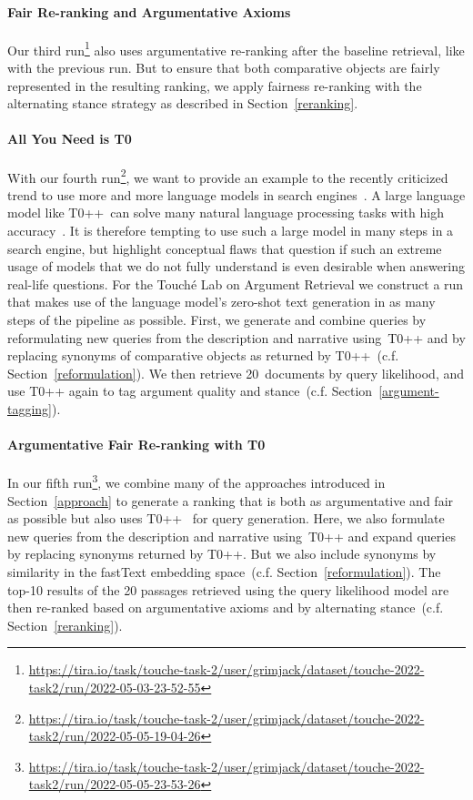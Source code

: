 \paragraph{Fair Re-ranking and Argumentative Axioms}

Our third run\footnote{\url{https://tira.io/task/touche-task-2/user/grimjack/dataset/touche-2022-task2/run/2022-05-03-23-52-55}} also uses argumentative re-ranking after the baseline retrieval, like with the previous run. But to ensure that both comparative objects are fairly represented in the resulting ranking, we apply fairness re-ranking with the alternating stance strategy as described in Section~\ref{reranking}.

\paragraph{All You Need is T0}

With our fourth run\footnote{\url{https://tira.io/task/touche-task-2/user/grimjack/dataset/touche-2022-task2/run/2022-05-05-19-04-26}}, we want to provide an example to the recently criticized trend to use more and more language models in search engines~\cite{ShahB2022}.
A large language model like T0++~can solve many natural language processing tasks with high accuracy~\cite{SanhWRBSACSLRDBXTSSKCNDCJWMSYPBWNRSSFFTBGBWR2021}.
It is therefore tempting to use such a large model in many steps in a search engine, but \citet{ShahB2022} highlight conceptual flaws that question if such an extreme usage of models that we do not fully understand is even desirable when answering real-life questions.
For the Touché Lab on Argument Retrieval we construct a run that makes use of the language model's zero-shot text generation in as many steps of the pipeline as possible.
First, we generate and combine queries by reformulating new queries from the description and narrative using~T0++ and by replacing synonyms of comparative objects as returned by T0++~(c.f. Section~\ref{reformulation}).
We then retrieve 20~documents by query likelihood, and use T0++ again to tag argument quality and stance~(c.f. Section~\ref{argument-tagging}).

\paragraph{Argumentative Fair Re-ranking with T0}

In our fifth run\footnote{\url{https://tira.io/task/touche-task-2/user/grimjack/dataset/touche-2022-task2/run/2022-05-05-23-53-26}}, we combine many of the approaches introduced in Section~\ref{approach} to generate a ranking that is both as argumentative and fair as possible but also uses T0++~\cite{SanhWRBSACSLRDBXTSSKCNDCJWMSYPBWNRSSFFTBGBWR2021} for query generation.
Here, we also formulate new queries from the description and narrative using~T0++ and expand queries by replacing synonyms returned by T0++. But we also include synonyms by similarity in the fastText embedding space~(c.f. Section~\ref{reformulation}).
The top-10 results of the 20 passages retrieved using the query likelihood model are then re-ranked based on argumentative axioms and by alternating stance~(c.f. Section~\ref{reranking}).


